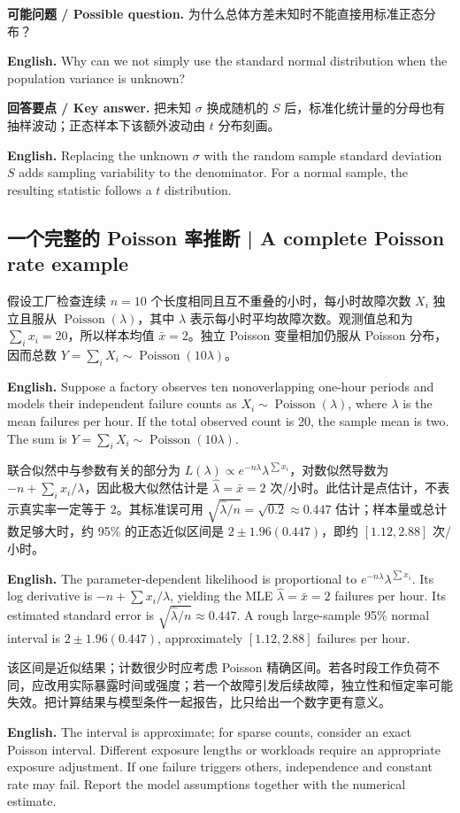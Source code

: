 \documentclass[UTF8,11pt,a4paper]{ctexart}
\newcommand{\EN}[1]{\par\noindent\textbf{English.} #1\par}
\newcommand{\ASK}[4]{\par\noindent\textbf{可能问题 / Possible question.} #1\par\EN{#2}\noindent\textbf{回答要点 / Key answer.} #3\par\EN{#4}\medskip}
\begin{document}
\ASK{为什么总体方差未知时不能直接用标准正态分布？}{Why can we not simply use the standard normal distribution when the population variance is unknown?}{把未知 $\sigma$ 换成随机的 $S$ 后，标准化统计量的分母也有抽样波动；正态样本下该额外波动由 $t$ 分布刻画。}{Replacing the unknown $\sigma$ with the random sample standard deviation $S$ adds sampling variability to the denominator. For a normal sample, the resulting statistic follows a $t$ distribution.}

\subsection{一个完整的 Poisson 率推断 | A complete Poisson rate example}
\noindent 假设工厂检查连续 $n=10$ 个长度相同且互不重叠的小时，每小时故障次数 $X_i$ 独立且服从 $\operatorname{Poisson}(\lambda)$，其中 $\lambda$ 表示每小时平均故障次数。观测值总和为 $\sum_i x_i=20$，所以样本均值 $\bar x=2$。独立 Poisson 变量相加仍服从 Poisson 分布，因而总数 $Y=\sum_iX_i\sim\operatorname{Poisson}(10\lambda)$。
\EN{Suppose a factory observes ten nonoverlapping one-hour periods and models their independent failure counts as $X_i\sim\operatorname{Poisson}(\lambda)$, where $\lambda$ is the mean failures per hour. If the total observed count is 20, the sample mean is two. The sum is $Y=\sum_iX_i\sim\operatorname{Poisson}(10\lambda)$.}

\noindent 联合似然中与参数有关的部分为 $L(\lambda)\propto e^{-n\lambda}\lambda^{\sum x_i}$，对数似然导数为 $-n+\sum_i x_i/\lambda$，因此极大似然估计是 $\hat\lambda=\bar x=2$ 次/小时。此估计是点估计，不表示真实率一定等于 $2$。其标准误可用 $\sqrt{\hat\lambda/n}=\sqrt{0.2}\approx0.447$ 估计；样本量或总计数足够大时，约 95\% 的正态近似区间是 $2\pm1.96(0.447)$，即约 $[1.12,2.88]$ 次/小时。
\EN{The parameter-dependent likelihood is proportional to $e^{-n\lambda}\lambda^{\sum x_i}$. Its log derivative is $-n+\sum x_i/\lambda$, yielding the MLE $\hat\lambda=\bar x=2$ failures per hour. Its estimated standard error is $\sqrt{\hat\lambda/n}\approx0.447$. A rough large-sample 95\% normal interval is $2\pm1.96(0.447)$, approximately $[1.12,2.88]$ failures per hour.}

\noindent 该区间是近似结果；计数很少时应考虑 Poisson 精确区间。若各时段工作负荷不同，应改用实际暴露时间或强度；若一个故障引发后续故障，独立性和恒定率可能失效。把计算结果与模型条件一起报告，比只给出一个数字更有意义。
\EN{The interval is approximate; for sparse counts, consider an exact Poisson interval. Different exposure lengths or workloads require an appropriate exposure adjustment. If one failure triggers others, independence and constant rate may fail. Report the model assumptions together with the numerical estimate.}
\end{document}
